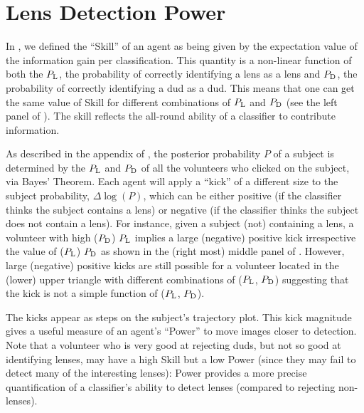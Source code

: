 \documentclass[useAMS,usenatbib,a4paper]{mn2e}
\begin{document}
\section{Lens Detection Power}
\label{appendix:power}

In \PaperOne, we defined the ``Skill'' of an agent as being given by the
expectation value of the information gain per classification. This
quantity is a non-linear function of both the $P_{\rm L}$, the
probability of correctly identifying a lens as a lens and $P_{\rm D}$,
the probability of correctly identifying a dud as a dud. This means that
one can get the same value of Skill for different combinations of
$P_{\rm L}$ and $P_{\rm D}$ (see the left panel of
). The skill reflects the all-round ability of a
classifier to contribute information.

As described in the appendix of \PaperOne, the posterior probability $P$
of a subject is determined by the $P_{\rm L}$ and $P_{\rm D}$ of all the
volunteers who clicked on the subject, via Bayes' Theorem. Each agent
will apply a ``kick'' of a different size to the subject probability,
$\Delta\log(P)$, which can be either positive (if the classifier thinks
the subject contains a lens) or negative (if the classifier thinks the
subject does not contain a lens). For instance, given a subject
(not) containing a lens, a volunteer with high ($P_{\rm D}$) $P_{\rm L}$
implies a large (negative) positive kick irrespective the value of
($P_{\rm L}$) $P_{\rm D}$ as shown in the (right most) middle panel of
. However, large (negative) positive kicks are
still possible for a volunteer located in the (lower) upper triangle
with different combinations of ($P_{\rm L}$, $P_{\rm D}$) suggesting that
the kick is not a simple function of ($P_{\rm L}$, $P_{\rm D}$).

The kicks appear as steps on the subject's trajectory plot. This kick
magnitude gives a useful measure of an agent's ``Power'' to move
images closer to detection.  Note that a volunteer who is very good at
rejecting duds, but not so good at identifying lenses, may have a high
Skill but a low Power (since they may fail to detect many of the
interesting lenses): Power provides a more precise quantification of a
classifier's ability to detect lenses (compared to rejecting non-lenses).
\end{document}
